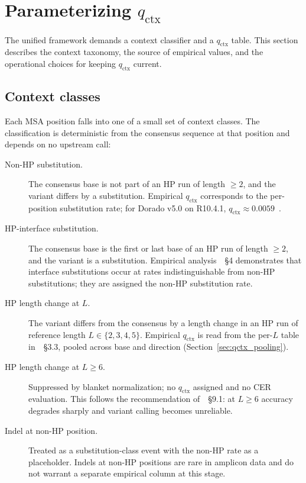 \documentclass[11pt]{article}
\begin{document}
\section{Parameterizing $q_\text{ctx}$}
\label{sec:parameterization}

The unified framework demands a context classifier and a $q_\text{ctx}$ table.
This section describes the context taxonomy, the source of empirical values,
and the operational choices for keeping $q_\text{ctx}$ current.

\subsection{Context classes}

Each MSA position falls into one of a small set of context classes. The
classification is deterministic from the consensus sequence at that position
and depends on no upstream call:

\begin{description}
\item[Non-HP substitution.] The consensus base is not part of an HP run of
length $\geq 2$, and the variant differs by a substitution. Empirical
$q_\text{ctx}$ corresponds to the per-position substitution rate; for Dorado
v5.0 on R10.4.1, $q_\text{ctx} \approx 0.0059$~\cite{hp_paper}.

\item[HP-interface substitution.] The consensus base is the first or last base
of an HP run of length $\geq 2$, and the variant is a substitution. Empirical
analysis~\cite{hp_paper}~\S 4 demonstrates that interface substitutions occur
at rates indistinguishable from non-HP substitutions; they are assigned the
non-HP substitution rate.

\item[HP length change at $L$.] The variant differs from the consensus by a
length change in an HP run of reference length $L \in \{2, 3, 4, 5\}$.
Empirical $q_\text{ctx}$ is read from the per-$L$ table
in~\cite{hp_paper}~\S 3.3, pooled across base and direction
(Section~\ref{sec:qctx_pooling}).

\item[HP length change at $L \geq 6$.] Suppressed by blanket normalization;
no $q_\text{ctx}$ assigned and no CER evaluation. This follows the
recommendation of~\cite{hp_paper}~\S 9.1: at $L \geq 6$ accuracy degrades
sharply and variant calling becomes unreliable.

\item[Indel at non-HP position.] Treated as a substitution-class event with
the non-HP rate as a placeholder. Indels at non-HP positions are rare in
amplicon data and do not warrant a separate empirical column at this stage.
\end{description}
\end{document}
